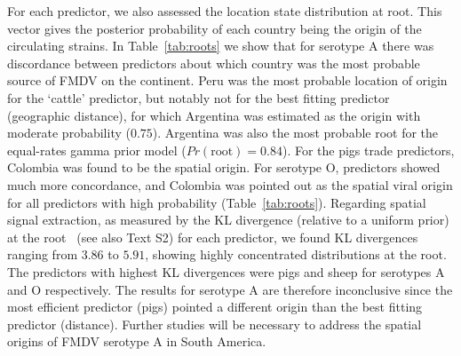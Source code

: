 \documentclass[10pt]{article}
\begin{document}
For each predictor, we also assessed the location state distribution at root. %
This vector gives the posterior probability of each country being the origin of the circulating strains.
In Table~\ref{tab:roots} we show that for serotype A there was discordance between predictors about which country was the most probable source of FMDV on the continent.
Peru was the most probable location of origin for the `cattle' predictor, but notably not for the best fitting predictor (geographic distance), for which Argentina was estimated as the origin with moderate probability ($0.75$).
Argentina was also the most probable root for the equal-rates gamma prior model ($Pr(\text{root})=0.84$).
For the pigs trade predictors, Colombia was found to be the spatial origin.
For serotype O, predictors showed much more concordance, and Colombia was pointed out as the spatial viral origin for all predictors with high probability (Table~\ref{tab:roots}).
Regarding spatial signal extraction, as measured by the KL divergence (relative  to a uniform prior) at the root~\cite{roots} (see also Text S2) for each predictor, we found KL divergences ranging from $3.86$ to $5.91$, showing highly concentrated distributions at the root. 
The predictors with highest KL divergences  were pigs and sheep for serotypes A and O respectively.
The results for serotype A are therefore inconclusive since the most efficient predictor (pigs) pointed a different origin than the best fitting predictor (distance).
Further studies will be necessary to address the spatial origins of FMDV serotype A in South America.
\end{document}
